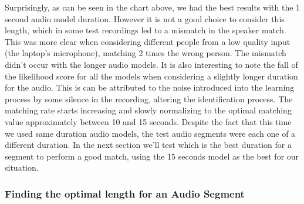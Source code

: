 \begin{center}


\end{center}

Surprisingly, as can be seen in the chart above, we had the best results with the
1 second audio model duration. However it is not a good choice to consider this length,
which in some test recordings led to a mismatch in the speaker match. This was more clear
when considering different people from a low quality input (the laptop's microphone),
matching 2 times the wrong person. The mismatch didn't occur with the longer audio models.
It is also interesting to note the fall of the likelihood score for all the models when considering
a slightly longer duration for the audio. This is can be attributed to the noise introduced into the learning process
by some silence in the recording, altering the identification process. The matching
rate starts increasing and slowly normalizing to the optimal matching value approximately
between 10 and 15 seconds.\newline
Despite the fact that this time we used same duration audio models, the test audio segments
were each one of a different duration. In the next section we'll test which is the best duration
for a segment to perform a good match, using the 15 seconds model as the best for our situation.

\subsubsection{Finding the optimal length for an Audio Segment}

